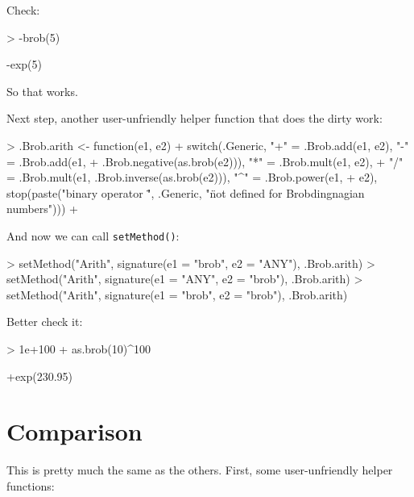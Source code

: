 \documentclass[a4paper]{article}
\begin{document}
Check:

\begin{Schunk}
\begin{Sinput}
> -brob(5)
\end{Sinput}
\begin{Soutput}
[1] -exp(5)
\end{Soutput}
\end{Schunk}

So that works.

Next step, another user-unfriendly helper function that does the dirty work:


\begin{Schunk}
\begin{Sinput}
> .Brob.arith <- function(e1, e2) {
+     switch(.Generic, "+" = .Brob.add(e1, e2), "-" = .Brob.add(e1, 
+         .Brob.negative(as.brob(e2))), "*" = .Brob.mult(e1, e2), 
+         "/" = .Brob.mult(e1, .Brob.inverse(as.brob(e2))), "^" = .Brob.power(e1, 
+             e2), stop(paste("binary operator \"", .Generic, "\" not defined for Brobdingnagian numbers")))
+ }
\end{Sinput}
\end{Schunk}


And now we can call {\tt setMethod()}:

\begin{Schunk}
\begin{Sinput}
> setMethod("Arith", signature(e1 = "brob", e2 = "ANY"), .Brob.arith)
> setMethod("Arith", signature(e1 = "ANY", e2 = "brob"), .Brob.arith)
> setMethod("Arith", signature(e1 = "brob", e2 = "brob"), .Brob.arith)
\end{Sinput}
\end{Schunk}

Better check it:

\begin{Schunk}
\begin{Sinput}
> 1e+100 + as.brob(10)^100
\end{Sinput}
\begin{Soutput}
[1] +exp(230.95)
\end{Soutput}
\end{Schunk}



\section{Comparison}


This is pretty much the same as the others.  First, some
user-unfriendly helper functions:
\end{document}
